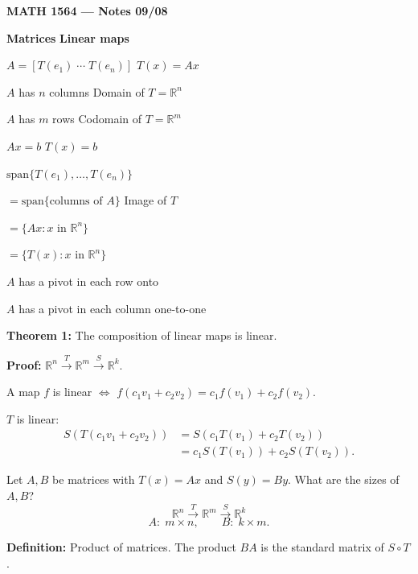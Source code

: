 \documentclass{article}
\begin{document}
\textbf{MATH 1564 --- Notes 09/08}

\bigskip

\textbf{Matrices} \hfill \textbf{Linear maps}

\medskip

$A = [T(e_1) \; \cdots \; T(e_n)]$ \hfill $T(x) = Ax$

\medskip

$A$ has $n$ columns \hfill Domain of $T = \mathbb{R}^n$

\medskip

$A$ has $m$ rows \hfill Codomain of $T = \mathbb{R}^m$

\bigskip

$Ax = b$ \hfill $T(x) = b$

\medskip

$\mathrm{span}\{T(e_1), \ldots, T(e_n)\}$

$= \mathrm{span}\{\text{columns of } A\}$ \hfill Image of $T$

$= \{Ax : x \text{ in } \mathbb{R}^n\}$

$= \{T(x) : x \text{ in } \mathbb{R}^n\}$

\bigskip

$A$ has a pivot in each row \hfill onto

$A$ has a pivot in each column \hfill one-to-one

\newpage

\textbf{Theorem 1:} The composition of linear maps is linear.

\medskip

\textbf{Proof:} $\mathbb{R}^n \xrightarrow{T} \mathbb{R}^m \xrightarrow{S} \mathbb{R}^k$.

\medskip

A map $f$ is linear $\iff$ $f(c_1v_1 + c_2v_2) = c_1f(v_1) + c_2f(v_2)$.

\medskip

$T$ is linear:
\begin{align*}
S(T(c_1v_1 + c_2v_2)) &= S(c_1T(v_1) + c_2T(v_2)) \\
&= c_1 S(T(v_1)) + c_2 S(T(v_2)).
\end{align*}

\bigskip

Let $A, B$ be matrices with $T(x) = Ax$ and $S(y) = By$. What are the sizes of $A, B$?
\[
\mathbb{R}^n \xrightarrow{T} \mathbb{R}^m \xrightarrow{S} \mathbb{R}^k
\]
\[
A: \; m \times n, \qquad B: \; k \times m.
\]

\bigskip

\textbf{Definition:} Product of matrices. The product $BA$ is the standard matrix of $S \circ T$.
\end{document}
